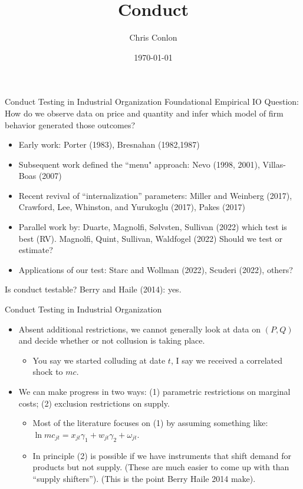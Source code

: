 

\usepackage{tabularx}
\usepackage{dcolumn}
\usepackage{ragged2e}
\usepackage{multirow,multicol,dcolumn}





\title{Conduct}
\author{Chris Conlon}
\date{\today}

\frame{\titlepage}


\begin{frame}[plain]{Conduct Testing in Industrial Organization}
Foundational Empirical IO Question: How do we observe data on price and quantity and infer which model of firm behavior generated those outcomes?

\begin{itemize}
\item Early work: Porter (1983), Bresnahan (1982,1987)
\item Subsequent work defined the ``menu" approach: Nevo (1998, 2001), Villas-Boas (2007) 
\item Recent revival of ``internalization'' parameters: Miller and Weinberg (2017), Crawford, Lee, Whinston, and Yurukoglu (2017), Pakes (2017)
\item Parallel work by: Duarte, Magnolfi, Sølvsten, Sullivan (2022) which test is best (RV). Magnolfi, Quint, Sullivan, Waldfogel (2022) Should we test or estimate?
\item Applications of our test: Starc and Wollman (2022), Scuderi (2022), others?
\end{itemize}
Is conduct testable? Berry and Haile (2014): yes.
\end{frame}


\begin{frame}{Conduct Testing in Industrial Organization}
\begin{itemize}
\item Absent additional restrictions, we cannot generally look at data on $(P,Q)$ and decide whether or not collusion is taking place.
\begin{itemize}
\item You say we started colluding at date $t$, I say we received a correlated shock to $mc$.
\end{itemize}
\item We can make progress in two ways: (1) parametric restrictions on marginal costs; (2) exclusion restrictions on supply.
\begin{itemize}
\item Most of the literature focuses on (1) by assuming something like: $\ln mc_{jt} = x_{jt} \gamma_1 + w_{jt} \gamma_2 + \omega_{jt}$.
\item In principle (2) is possible if we have instruments that shift demand for products but not supply. (These are much easier to come up with than ``supply shifters''). (This is the point Berry Haile 2014 make).
\end{itemize}
\end{itemize}
\end{frame}



